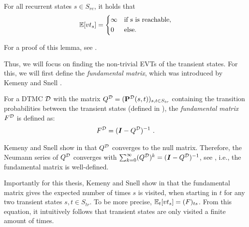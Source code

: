 \begin{lemma}\label{lem:EVTs_of_recurrent_states}
    For all recurrent states $s\in S_{re}$, it holds that
    \[\Exp[vt_s] = 
    \begin{cases*}
        \infty & if s is reachable,\\
        0 & else.
    \end{cases*}\]
\end{lemma}
For a proof of this lemma, see \cite{Computing_EVTs_Stationary_Distr_in_MCs_Mertens}.

Thus, we will focus on finding the non-trivial EVTs of the transient states.
For this, we will first define the \textit{fundamental matrix}, which was introduced by Kemeny and Snell \cite{KemenySnellBook}.

\begin{definition}\label{def:fundamental_matrix}
    For a DTMC $\mathcal{D}$ with the matrix $Q^{\mathcal{D}} = (\mathbf{P}^{\mathcal{D}}(s,t))_{s,t\in S_{tr}}$ containing the transition probabilities between the transient states (defined in ), the \textit{fundamental matrix} $F^{\mathcal{D}}$ is defined as:
    \[F^{\mathcal{D}} = (\bm{I} - Q^{\mathcal{D}})^{-1}\ .\]
\end{definition}
Kemeny and Snell show in \cite{KemenySnellBook} that $Q^{\mathcal{D}}$ converges to the null matrix. Therefore, the Neumann series of $Q^{\mathcal{D}}$ converges with $\sum^\infty_{k=0}(Q^{\mathcal{D}})^k = (\bm{I} - Q^{\mathcal{D}})^{-1}$, see , i.e., the fundamental matrix is well-defined.

Importantly for this thesis, Kemeny and Snell show in \cite{KemenySnellBook} that the fundamental matrix gives the expected number of times $s$ is visited, when starting in $t$ for any two transient states $s,t\in S_{tr}$. To be more precise, $\mathbb{E}_t[vt_s] = (F)_{ts}$. From this equation, it intuitively follows that transient states are only visited a finite amount of times.

